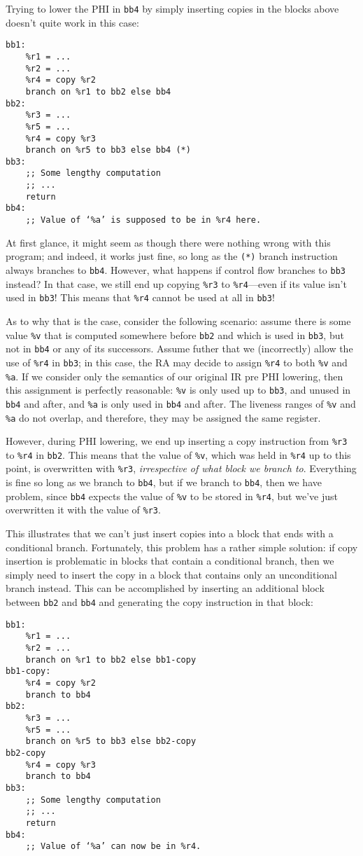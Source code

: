 \documentclass[12pt]{report}
\begin{document}
\noindent Trying to lower the PHI in \verb|bb4| by simply inserting copies in the blocks above doesn't quite work in this case:
\begin{Verbatim}
bb1:
    %r1 = ...
    %r2 = ...
    %r4 = copy %r2
    branch on %r1 to bb2 else bb4
bb2:
    %r3 = ...
    %r5 = ...
    %r4 = copy %r3
    branch on %r5 to bb3 else bb4 (*)
bb3:
    ;; Some lengthy computation
    ;; ...
    return
bb4:
    ;; Value of ‘%a’ is supposed to be in %r4 here.
\end{Verbatim}

\noindent At first glance, it might seem as though there were nothing wrong with this program; and indeed, it works just fine, so long
as the \verb|(*)| branch instruction always branches to \verb|bb4|. However, what happens if control flow branches to \verb|bb3| instead?
In that case, we still end up copying \verb|%r3| to \verb|%r4|—even if its value isn't used in \verb|bb3|! This means that \verb|%r4|
cannot be used at all in \verb|bb3|!

As to why that is the case, consider the following scenario: assume there is some value \verb|%v| that is computed somewhere before
\verb|bb2| and which is used in \verb|bb3|, but not in \verb|bb4| or any of its successors. Assume futher that we (incorrectly) allow
the use of \verb|%r4| in \verb|bb3|; in this case, the RA may decide to assign \verb|%r4| to both \verb|%v| and \verb|%a|. If we consider
only the semantics of our original IR pre PHI lowering, then this assignment is perfectly reasonable: \verb|%v| is only used up to
\verb|bb3|, and unused in \verb|bb4| and after, and \verb|%a| is only used in \verb|bb4| and after. The liveness ranges of \verb|%v| and
\verb|%a| do not overlap, and therefore, they may be assigned the same register.

However, during PHI lowering, we end up inserting a copy instruction from \verb|%r3| to \verb|%r4| in \verb|bb2|. This means that the value
of \verb|%v|, which was held in \verb|%r4| up to this point, is overwritten with \verb|%r3|, \textit{irrespective of what block we branch
to}. Everything is fine so long as we branch to \verb|bb4|, but if we branch to \verb|bb4|, then we have problem, since \verb|bb4|
expects the value of \verb|%v| to be stored in \verb|%r4|, but we've just overwritten it with the value of \verb|%r3|.

This illustrates that we can't just insert copies into a block that ends with a conditional branch. Fortunately, this problem has a rather
simple solution: if copy insertion is problematic in blocks that contain a conditional branch, then we simply need to insert the copy in a
block that contains only an unconditional branch instead. This can be accomplished by inserting an additional block between \verb|bb2| and
\verb|bb4| and generating the copy instruction in that block:
\begin{Verbatim}
bb1:
    %r1 = ...
    %r2 = ...
    branch on %r1 to bb2 else bb1-copy
bb1-copy:
    %r4 = copy %r2
    branch to bb4
bb2:
    %r3 = ...
    %r5 = ...
    branch on %r5 to bb3 else bb2-copy
bb2-copy
    %r4 = copy %r3
    branch to bb4
bb3:
    ;; Some lengthy computation
    ;; ...
    return
bb4:
    ;; Value of ‘%a’ can now be in %r4.
\end{Verbatim}
\end{document}
